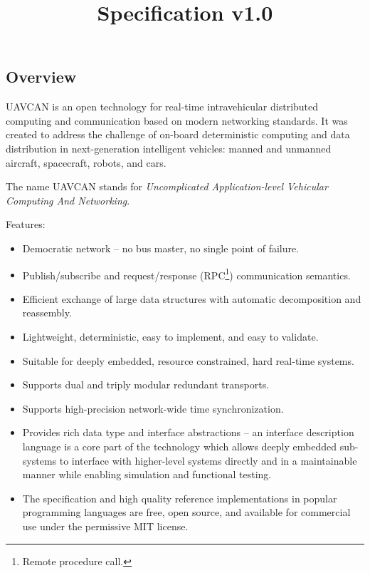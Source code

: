 \documentclass{uavcandoc}
\title{Specification v1.0}
\begin{document}
\frontmatter

\begin{titlepage}

\section*{Overview}

UAVCAN is an open technology for real-time intravehicular distributed computing and communication
based on modern networking standards.
It was created to address the challenge of on-board deterministic computing and data distribution in
next-generation intelligent vehicles: manned and unmanned aircraft, spacecraft, robots, and cars.

The name UAVCAN stands for \emph{Uncomplicated Application-level Vehicular Computing And Networking}.

Features:

\begin{itemize}
    \item Democratic network -- no bus master, no single point of failure.
    \item Publish/subscribe and request/response (RPC\footnote{Remote procedure call.}) com\-mu\-ni\-ca\-tion semantics.
    \item Efficient exchange of large data structures with automatic decomposition and reassembly.
    \item Lightweight, deterministic, easy to implement, and easy to validate.
    \item Suitable for deeply embedded, resource constrained, hard real-time systems.
    \item Supports dual and triply modular redundant transports.
    \item Supports high-precision network-wide time syn\-chro\-ni\-za\-tion.
    \item Provides rich data type and interface abstractions -- an interface description language is a core part of
    the technology which allows deeply embedded sub-systems to interface with higher-level systems directly and
    in a maintainable manner while enabling simulation and functional testing.
    \item The specification and high quality reference implementations in popular programming languages are free,
    open source, and available for commercial use under the permissive MIT license.
\end{itemize}

\BeginRightColumn


\end{titlepage}
\end{document}
